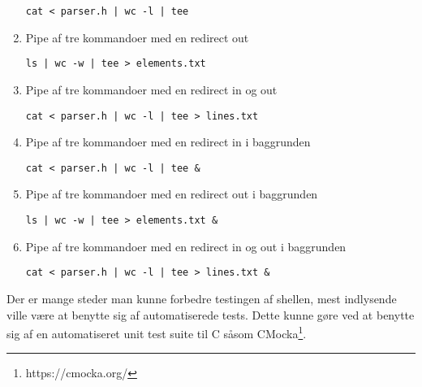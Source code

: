 \begin{enumerate}
	\verb+cat < parser.h | wc -l | tee+
	\item  Pipe af tre kommandoer med en redirect out
	
	\verb+ls | wc -w | tee > elements.txt+
	\item  Pipe af tre kommandoer med en redirect in og out
	
	\verb+cat < parser.h | wc -l | tee > lines.txt+
	\item  Pipe af tre kommandoer med en redirect in i baggrunden
	
	\verb+cat < parser.h | wc -l | tee &+
	\item  Pipe af tre kommandoer med en redirect out i baggrunden
	
	\verb+ls | wc -w | tee > elements.txt &+
	\item  Pipe af tre kommandoer med en redirect in og out i baggrunden
	
	\verb+cat < parser.h | wc -l | tee > lines.txt &+
\end{enumerate}

Der er mange steder man kunne forbedre testingen af shellen, mest indlysende ville være at benytte sig af automatiserede tests. Dette kunne gøre ved at benytte sig af en automatiseret unit test suite til C såsom CMocka\footnote{https://cmocka.org/}.
